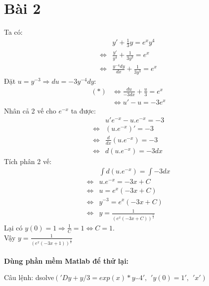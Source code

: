 \documentclass[a4paper,12pt]{report}
\begin{document}
\section*{Bài 2}
Ta có:
\begin{align*}
    &y' + \frac{1}{3}y = e^{x}y^{4}\\
    \Longleftrightarrow &\frac{y'}{y^{4}} + \frac{1}{3y^{3}} = e^{x}\\
    \Longleftrightarrow &\frac{y^{-4}dy}{dx} + \frac{1}{3y^{3}} = e^{x}
\end{align*}
Đặt $u = y^{-3} \Longrightarrow du = -3y^{-4}dy$:
\begin{align*}
    (*) &\Longleftrightarrow \frac{du}{-3dx} + \frac{u}{3} = e^{x}\\
    &\Longleftrightarrow u' - u = -3e^{x}
\end{align*}
Nhân cả 2 vế cho $e^{-x}$ ta được:
\begin{align*}
    &u'e^{-x} - u.e^{-x} = -3\\
    \Longleftrightarrow &(u.e^{-x})' = -3\\
    \Longleftrightarrow &\frac{d}{dx}(u.e^{-x}) = -3\\
    \Longleftrightarrow &d(u.e^{-x}) = -3dx
\end{align*}
Tích phân 2 vế:
\begin{align*}
    &\int d(u.e^{-x}) = \int -3dx\\
    \Longleftrightarrow &u.e^{-x} = -3x + C\\
    \Longleftrightarrow &u = e^{x}(-3x + C)\\
    \Longleftrightarrow &y^{-3} = e^{x}(-3x+C)\\
    \Longleftrightarrow &y = \frac{1}{(e^{x}(-3x + C))^{\frac{1}{3}}}
\end{align*}
Lại có $y(0) = 1 \Rightarrow \frac{1}{C} = 1 \Leftrightarrow C = 1$.
\\
Vậy $y = \frac{1}{(e^{x}(-3x + 1))^{\frac{1}{3}}}$
\\ \\
\textbf{Dùng phần mềm Matlab để thử lại:}

Câu lệnh: dsolve$('Dy + y/3 = exp(x) * y \hat{\hspace{7pt}} 4', \hspace{5pt} 'y(0) = 1', \hspace{5pt} 'x')$
\end{document}

